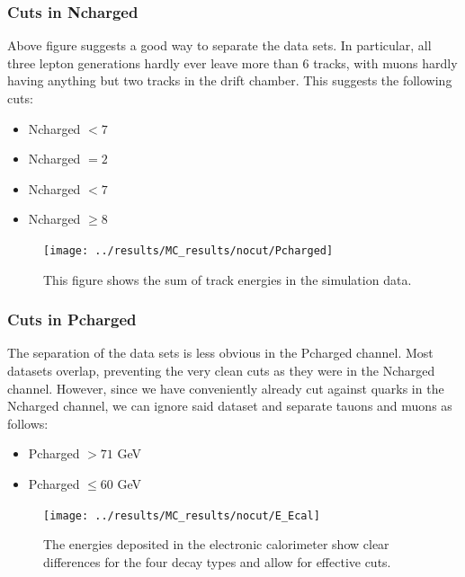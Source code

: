 \subsubsection{Cuts in Ncharged}
Above figure suggests a good way to separate the data sets. In particular, all three lepton generations hardly ever leave more than 6 tracks, with muons hardly having anything but two tracks in the drift chamber. This suggests the following cuts:

\begin{itemize}
	\item{ Ncharged $<7$}
	\item{ Ncharged $=2$}
	\item{ Ncharged $<7$}
	\item{ Ncharged $\ge8$}
\end{itemize}



\newpage
\begin{figure}[H]
\centering
\texttt{[image: ../results/MC\_results/nocut/Pcharged]}
\caption[Pcharged in simulation data]{This figure shows the sum of track energies in the simulation data. }
\label{fig:Pcharged}
\end{figure}

\subsubsection{Cuts in Pcharged}
The separation of the data sets is less obvious in the Pcharged channel. Most datasets overlap, preventing the very clean cuts as they were in the Ncharged channel. However, since we have conveniently already cut against quarks in the Ncharged channel, we can ignore said dataset and separate tauons and muons as follows:
\begin{itemize}
	\item{ Pcharged $>71$ GeV}
	\item{ Pcharged $\le60$ GeV}
\end{itemize}

\newpage
\begin{figure}[H]
\centering
\texttt{[image: ../results/MC\_results/nocut/E\_Ecal]}
\caption[E\_Ecal in simulations]{The energies deposited in the electronic calorimeter show clear differences for the four decay types and allow for effective cuts.}
\label{fig:E_Ecal}
\end{figure}

